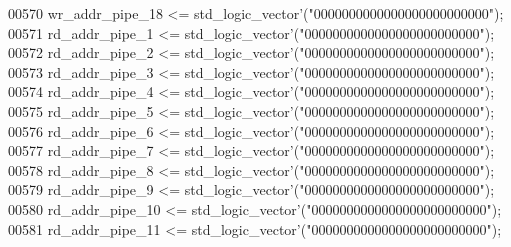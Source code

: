 \begin{DoxyCode}
00570       \textcolor{vhdlchar}{wr_addr_pipe_18} \textcolor{vhdlchar}{<=} \textcolor{comment}{std\_logic\_vector}\textcolor{vhdlchar}{'}\textcolor{vhdlchar}{(}\textcolor{vhdllogic}{"0000000000000000000000000"}\textcolor{vhdlchar}{)};
00571       \textcolor{vhdlchar}{rd_addr_pipe_1} \textcolor{vhdlchar}{<=} \textcolor{comment}{std\_logic\_vector}\textcolor{vhdlchar}{'}\textcolor{vhdlchar}{(}\textcolor{vhdllogic}{"0000000000000000000000000"}\textcolor{vhdlchar}{)};
00572       \textcolor{vhdlchar}{rd_addr_pipe_2} \textcolor{vhdlchar}{<=} \textcolor{comment}{std\_logic\_vector}\textcolor{vhdlchar}{'}\textcolor{vhdlchar}{(}\textcolor{vhdllogic}{"0000000000000000000000000"}\textcolor{vhdlchar}{)};
00573       \textcolor{vhdlchar}{rd_addr_pipe_3} \textcolor{vhdlchar}{<=} \textcolor{comment}{std\_logic\_vector}\textcolor{vhdlchar}{'}\textcolor{vhdlchar}{(}\textcolor{vhdllogic}{"0000000000000000000000000"}\textcolor{vhdlchar}{)};
00574       \textcolor{vhdlchar}{rd_addr_pipe_4} \textcolor{vhdlchar}{<=} \textcolor{comment}{std\_logic\_vector}\textcolor{vhdlchar}{'}\textcolor{vhdlchar}{(}\textcolor{vhdllogic}{"0000000000000000000000000"}\textcolor{vhdlchar}{)};
00575       \textcolor{vhdlchar}{rd_addr_pipe_5} \textcolor{vhdlchar}{<=} \textcolor{comment}{std\_logic\_vector}\textcolor{vhdlchar}{'}\textcolor{vhdlchar}{(}\textcolor{vhdllogic}{"0000000000000000000000000"}\textcolor{vhdlchar}{)};
00576       \textcolor{vhdlchar}{rd_addr_pipe_6} \textcolor{vhdlchar}{<=} \textcolor{comment}{std\_logic\_vector}\textcolor{vhdlchar}{'}\textcolor{vhdlchar}{(}\textcolor{vhdllogic}{"0000000000000000000000000"}\textcolor{vhdlchar}{)};
00577       \textcolor{vhdlchar}{rd_addr_pipe_7} \textcolor{vhdlchar}{<=} \textcolor{comment}{std\_logic\_vector}\textcolor{vhdlchar}{'}\textcolor{vhdlchar}{(}\textcolor{vhdllogic}{"0000000000000000000000000"}\textcolor{vhdlchar}{)};
00578       \textcolor{vhdlchar}{rd_addr_pipe_8} \textcolor{vhdlchar}{<=} \textcolor{comment}{std\_logic\_vector}\textcolor{vhdlchar}{'}\textcolor{vhdlchar}{(}\textcolor{vhdllogic}{"0000000000000000000000000"}\textcolor{vhdlchar}{)};
00579       \textcolor{vhdlchar}{rd_addr_pipe_9} \textcolor{vhdlchar}{<=} \textcolor{comment}{std\_logic\_vector}\textcolor{vhdlchar}{'}\textcolor{vhdlchar}{(}\textcolor{vhdllogic}{"0000000000000000000000000"}\textcolor{vhdlchar}{)};
00580       \textcolor{vhdlchar}{rd_addr_pipe_10} \textcolor{vhdlchar}{<=} \textcolor{comment}{std\_logic\_vector}\textcolor{vhdlchar}{'}\textcolor{vhdlchar}{(}\textcolor{vhdllogic}{"0000000000000000000000000"}\textcolor{vhdlchar}{)};
00581       \textcolor{vhdlchar}{rd_addr_pipe_11} \textcolor{vhdlchar}{<=} \textcolor{comment}{std\_logic\_vector}\textcolor{vhdlchar}{'}\textcolor{vhdlchar}{(}\textcolor{vhdllogic}{"0000000000000000000000000"}\textcolor{vhdlchar}{)};

\end{DoxyCode}

